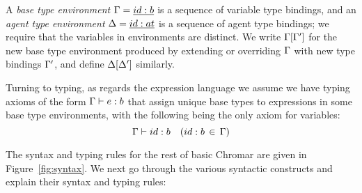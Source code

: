 A \emph{base type environment} $\Gamma = \underline{id:b}$ is a sequence of variable type
bindings, and an \emph{agent type environment} $\Delta = \underline{id:at}$ is a sequence of
agent type bindings; we require that the variables in environments are distinct.
We write $\Gamma[\Gamma']$ for the new base type environment produced by extending or
overriding $\Gamma$ with new type bindings $\Gamma'$, and define $\Delta[\Delta']$ similarly.

Turning to typing, as regards the expression language we assume we have typing
axioms of the form $\Gamma \vdash e : b$ that assign unique base types to expressions in
some base type environments, with the following being the only axiom for
variables:
 \[\Gamma \vdash id:b  \quad (id:b \, \in \, \Gamma)\]

 The syntax and typing rules for the rest of basic Chromar are given in
 Figure~\ref{fig:syntax}. We next go through the various syntactic constructs
 and explain their syntax and typing rules:


